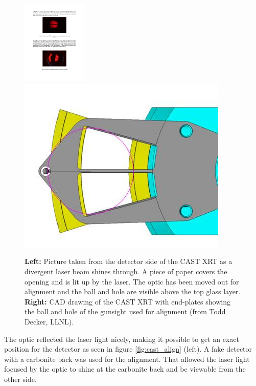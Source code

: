 \begin{figure}[htbp]
  \centering
    \includegraphics[height=4cm,trim=40 10 60 0, clip]{figures/cast/ballandhole.pdf}
    \includegraphics[width=0.47\linewidth]{figures/cast/ballandhole.jpg}
  \caption{\footnotesize \textbf{Left:} Picture taken from the detector side of the CAST XRT as a divergent laser beam shines through. A piece of paper covers the opening and is lit up by the laser. The optic has been moved out for alignment and the ball and hole are visible above the top glass layer. \textbf{Right:} CAD drawing of the CAST XRT with end-plates showing the ball and hole of the gunsight used for alignment (from Todd Decker, LLNL). }
  \label{fig:ball_and_hole}
\end{figure}

The optic reflected the laser light nicely, making it possible to get an exact position for the detector as seen in figure \ref{fig:cast_align} (left). A fake detector with a carbonite back was used for the alignment. That allowed the laser light focused by the optic to shine at the carbonite back and be viewable from the other side.

